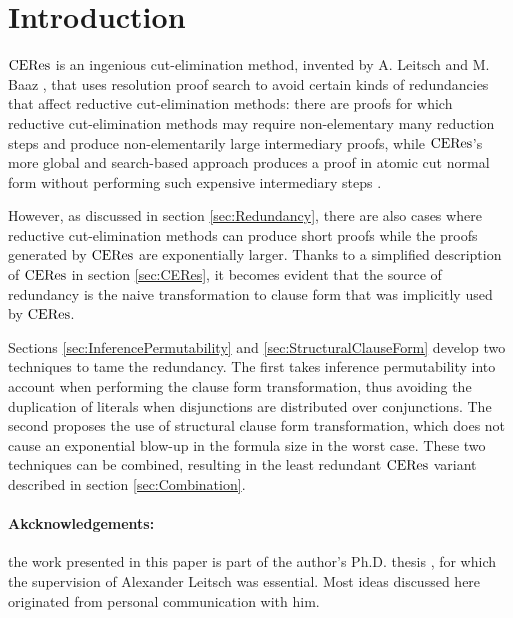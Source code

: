 \section{Introduction}

$\mathrm{CERes}$ is an ingenious cut-elimination method, invented by A. Leitsch and M. Baaz \cite{BaazLeitsch1999MethodsofCut-Elimination,BaazLeitsch2000Cut-eliminationandRedundancy-eliminationbyResolution,BaazLeitsch2006Towardsaclausalanalysisofcut-elimination}, that uses resolution proof search to avoid certain kinds of redundancies that affect reductive cut-elimination methods: there are proofs for which reductive cut-elimination methods may require non-elementary many reduction steps and produce non-elementarily large intermediary proofs, while $\mathrm{CERes}$'s more global and search-based approach produces a proof in atomic cut normal form without performing such expensive intermediary steps \cite{BaazLeitsch2009MethodsofCut-Elimination}. 

However, as discussed in section \ref{sec:Redundancy}, there are also cases where reductive cut-elimination methods can produce short proofs while the proofs generated by $\mathrm{CERes}$ are exponentially larger. Thanks to a simplified description of $\mathrm{CERes}$ in section \ref{sec:CERes}, it becomes evident that the source of redundancy is the naive transformation to clause form that was implicitly used by $\mathrm{CERes}$.

Sections \ref{sec:InferencePermutability} and \ref{sec:StructuralClauseForm} develop two techniques to tame the redundancy. The first takes inference permutability into account when performing the clause form transformation, thus avoiding the duplication of literals when disjunctions are distributed over conjunctions. The second proposes the use of structural clause form transformation, which does not cause an exponential blow-up in the formula size in the worst case. These two techniques can be combined, resulting in the least redundant $\mathrm{CERes}$ variant described in section \ref{sec:Combination}.

\paragraph{Akcknowledgements:} the work presented in this paper is part of the author's Ph.D. thesis \cite{ToDo}, for which the supervision of Alexander Leitsch was essential. Most ideas discussed here originated from personal communication with him.